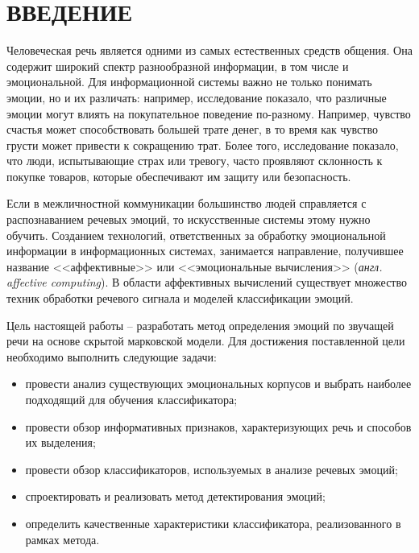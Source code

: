 \part*{ВВЕДЕНИЕ}
Человеческая речь является одними из самых естественных средств общения. Она содержит широкий спектр разнообразной информации, в том числе и эмоциональной. Для информационной системы важно не только понимать эмоции, но и их различать: например, исследование \cite{hsee2008feeling} показало, что  различные эмоции могут влиять на покупательное поведение по-разному. Например, чувство счастья может способствовать большей трате денег, в то время как чувство грусти может привести к сокращению трат. Более того, исследование показало, что люди, испытывающие страх или тревогу, часто проявляют склонность к покупке товаров, которые обеспечивают им защиту или безопасность.

Если в межличностной коммуникации большинство людей справляется с распознаванием речевых эмоций, то искусственные системы этому нужно обучить. Созданием технологий, ответственных за обработку эмоциональной информации в информационных системах, занимается направление, получившее название <<аффективные>> или <<эмоциональные вычисления>> (\textit{англ. affective computing}). В области аффективных вычислений существует множество техник обработки речевого сигнала и моделей классификации эмоций. 


Цель настоящей работы -- разработать метод определения эмоций по звучащей речи на основе скрытой марковской модели. Для достижения поставленной цели необходимо выполнить следующие задачи:
\begin{itemize}
	\item провести анализ существующих эмоциональных корпусов и выбрать наиболее подходящий для обучения классификатора;
	\item провести обзор информативных признаков, характеризующих речь и способов их выделения;
	\item провести обзор классификаторов, используемых в анализе речевых эмоций;
	\item спроектировать и реализовать метод детектирования эмоций;
	\item определить качественные характеристики классификатора, реализованного в рамках метода.
\end{itemize}